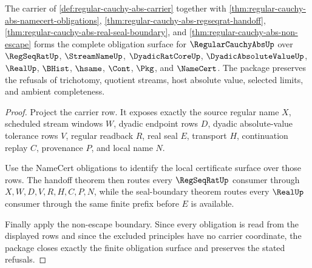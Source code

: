 \begin{theorem}
\label{thm:regularcauchyabs-obligation-closure}
The carrier of \autoref{def:regular-cauchy-abs-carrier} together with \autoref{thm:regular-cauchy-abs-namecert-obligations}, \autoref{thm:regular-cauchy-abs-regseqrat-handoff}, \autoref{thm:regular-cauchy-abs-real-seal-boundary}, and \autoref{thm:regular-cauchy-abs-non-escape} forms the complete obligation surface for $\RegularCauchyAbsUp$ over $\RegSeqRatUp$, $\StreamNameUp$, $\DyadicRatCoreUp$, $\DyadicAbsoluteValueUp$, $\RealUp$, $\BHist$, $\hsame$, $\Cont$, $\Pkg$, and $\NameCert$. The package preserves the refusals of trichotomy, quotient streams, host absolute value, selected limits, and ambient completeness.
\end{theorem}
\begin{proof}
Project the carrier row. It exposes exactly the source regular name $X$, scheduled stream windows $W$, dyadic endpoint rows $D$, dyadic absolute-value tolerance rows $V$, regular readback $R$, real seal $E$, transport $H$, continuation replay $C$, provenance $P$, and local name $N$.

Use the NameCert obligations to identify the local certificate surface over those rows. The handoff theorem then routes every $\RegSeqRatUp$ consumer through $X,W,D,V,R,H,C,P,N$, while the seal-boundary theorem routes every $\RealUp$ consumer through the same finite prefix before $E$ is available.

Finally apply the non-escape boundary. Since every obligation is read from the displayed rows and since the excluded principles have no carrier coordinate, the package closes exactly the finite obligation surface and preserves the stated refusals.
\end{proof}


